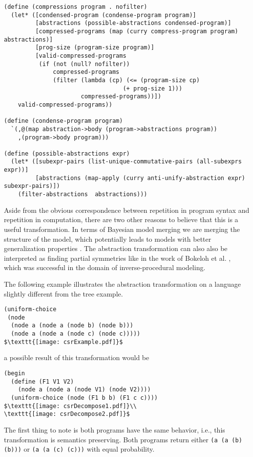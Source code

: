 \documentclass[a4paper,10pt]{article}
\begin{document}
\begin{lstlisting}[frame=trBL]
(define (compressions program . nofilter)
  (let* ([condensed-program (condense-program program)]
         [abstractions (possible-abstractions condensed-program)]
         [compressed-programs (map (curry compress-program program) abstractions)]
         [prog-size (program-size program)]
         [valid-compressed-programs
          (if (not (null? nofilter))
              compressed-programs
              (filter (lambda (cp) (<= (program-size cp)
                                  (+ prog-size 1)))
                      compressed-programs))])
    valid-compressed-programs))

(define (condense-program program)
  `(,@(map abstraction->body (program->abstractions program))
    ,(program->body program)))

(define (possible-abstractions expr)
  (let* ([subexpr-pairs (list-unique-commutative-pairs (all-subexprs expr))]
         [abstractions (map-apply (curry anti-unify-abstraction expr) subexpr-pairs)])
    (filter-abstractions  abstractions)))
\end{lstlisting}

Aside from the obvious correspondence between repetition in program syntax and repetition in computation, there are two other reasons to believe that this is a useful transformation. In terms of Bayesian model merging we are merging the structure of the model, which potentially leads to models with better generalization properties \cite{Stolcke:1994:IPG:645515.658235}. The abstraction transformation can also also be interpreted as finding partial symmetries like in the work of Bokeloh et al. \cite{DBLP:journals/tog/BokelohWS10}, which was successful in the domain of inverse-procedural modeling.

The following example illustrates the abstraction transformation on a language slightly different from the tree example.
\begin{lstlisting}[mathescape=true]
(uniform-choice 
 (node
  (node a (node a (node b) (node b)))
  (node a (node a (node c) (node c)))))
$\texttt{[image: csrExample.pdf]}$
\end{lstlisting}
a possible result of this transformation would be
\begin{lstlisting}[mathescape=true]
(begin
  (define (F1 V1 V2)
    (node a (node a (node V1) (node V2))))
  (uniform-choice (node (F1 b b) (F1 c c))))
$\texttt{[image: csrDecompose1.pdf]}\\
\texttt{[image: csrDecompose2.pdf]}$
\end{lstlisting}
The first thing to note is both programs have the same behavior, i.e., this transformation is semantics preserving.  Both programs return either \texttt{(a (a (b) (b)))} or \texttt{(a (a (c) (c)))} with equal probability.
\end{document}
